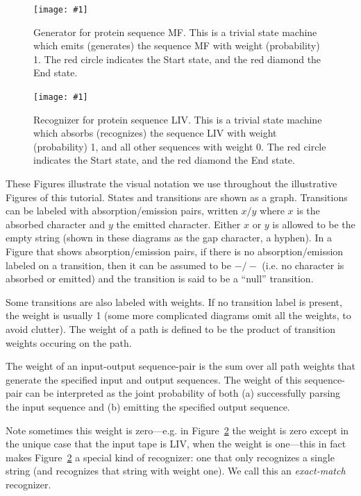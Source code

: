 \documentclass{article}
\newcommand{\figref}[1]{Figure~\ref{Figures.#1}}
\newcommand{\figlabel}[1]{\label{Figures.#1}}
\newcommand{\easyfig}[4]{
\begin{figure}
\texttt{[image: \#1]}
\caption{ \figlabel{#3} #4}
\end{figure}}
\newcommand{\widepngfig}[2]{\easyfig{#1.png}{width=\textwidth}{#1}{#2}}
\begin{document}
\widepngfig{mf-generator}{Generator for protein sequence MF.  
This is a trivial state machine which emits (generates) the sequence MF with weight (probability) 1.
The red circle indicates the Start state, and the red diamond the End state.
}

\widepngfig{liv-small}{Recognizer for protein sequence LIV.
This is a trivial state machine which absorbs (recognizes) the sequence LIV with weight (probability) 1, and all other sequences with weight 0.
The red circle indicates the Start state, and the red diamond the End state.
}

These Figures illustrate the visual notation we use throughout the illustrative Figures of this tutorial.
States and transitions are shown as a graph.
Transitions can be labeled with absorption/emission pairs,
written $x/y$ where $x$ is the absorbed character and $y$ the emitted character.
Either $x$ or $y$ is allowed to be the empty string (shown in these diagrams as the gap character, a hyphen).
In a Figure that shows absorption/emission pairs,
if there is no absorption/emission labeled on a transition, then it can be assumed to be $-/-$
(i.e. no character is absorbed or emitted) and the transition is said to be a ``null'' transition.

Some transitions are also labeled with weights.
If no transition label is present, the weight is usually 1
(some more complicated diagrams omit all the weights, to avoid clutter).
The weight of a path is defined to be the  product of transition weights occuring on the path. 

The weight of an input-output sequence-pair is the sum over all path weights that generate the
specified  input and output sequences.  
The weight of this sequence-pair can be interpreted as the joint probability of both
(a) successfully parsing the input sequence and
(b) emitting the specified output sequence.

Note sometimes this weight is zero---e.g. in \figref{liv-small} the weight is zero
except in the unique case that the input tape is LIV, when the weight is one---this
in fact makes \figref{liv-small} a special kind of recognizer:
one that only recognizes a single string
(and recognizes that string with weight one).
We call this an {\em exact-match} recognizer.
\end{document}

